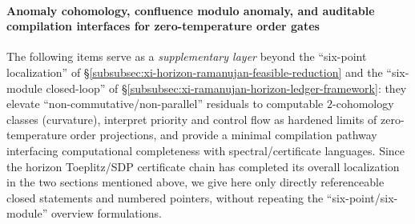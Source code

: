 \paragraph{Anomaly cohomology, confluence modulo anomaly, and auditable compilation interfaces for zero-temperature order gates}
The following items serve as a \emph{supplementary layer} beyond the ``six-point localization'' of \S\ref{subsubsec:xi-horizon-ramanujan-feasible-reduction} and the ``six-module closed-loop'' of \S\ref{subsubsec:xi-ramanujan-horizon-ledger-framework}: they elevate ``non-commutative/non-parallel'' residuals to computable \(2\)-cohomology classes (curvature), interpret priority and control flow as hardened limits of zero-temperature order projections, and provide a minimal compilation pathway interfacing computational completeness with spectral/certificate languages. Since the horizon Toeplitz/SDP certificate chain has completed its overall localization in the two sections mentioned above, we give here only directly referenceable closed statements and numbered pointers, without repeating the ``six-point/six-module'' overview formulations.
